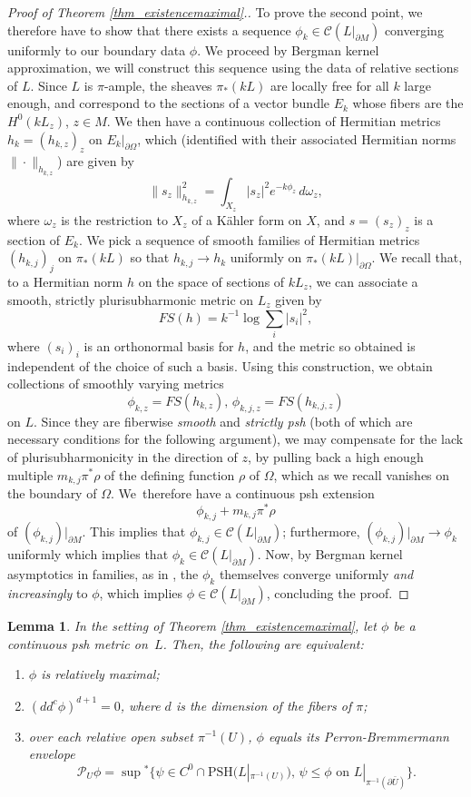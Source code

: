 \documentclass[JEP,XML,SOM,Unicode,NoEqCountersInSection,published]{cedram}
\newtheorem{lemma}[theorem]{Lemma}
\theoremstyle{definition}
\newcommand\cC{\mathcal{C}}
\newcommand\cP{\mathcal{P}}
\newcommand\mi{^{-1}}
\newcommand\norm{\|{\cdot}\|}
\newcommand\PSH{\mathrm{PSH}}
\begin{document}
\begin{proof}[Proof of Theorem \ref{thm_existencemaximal}.]
To prove the second point, we therefore have to show that there exists a sequence $\phi_k\in\cC(L|_{\partial M})$ converging uniformly to our boundary data $\phi$. We proceed by Bergman kernel approximation, \ie we will construct this sequence using the data of relative sections of $L$. Since $L$ is $\pi$-ample, the sheaves $\pi_*(kL)$ are locally free for all $k$ large enough, and correspond to the sections of a vector bundle $E_k$ whose fibers are the $H^0(kL_z)$, $z\in M$. We then have a continuous collection of Hermitian metrics $h_k=(h_{k,z})_z$ on $E_k|_{\partial \Omega}$, which (identified with their associated Hermitian norms $\norm_{h_{k,z}}$) are given by
\[
\|s_z\|_{h_{k,z}}^2=\int_{X_z}|s_z|^2 e^{-k\phi_z}\,d\omega_z,
\]
where $\omega_z$ is the restriction to $X_z$ of a Kähler form on $X$, and $s=(s_z)_z$ is a section of $E_k$. We pick a sequence of smooth families of Hermitian metrics $(h_{k,j})_j$ on $\pi_*(kL)$ so that $h_{k,j}\to h_k$ uniformly on $\pi_*(kL)|_{\partial \Omega}$. We recall that, to a Hermitian norm $h$ on the space of sections of $kL_z$, we can associate a smooth, strictly plurisubharmonic metric on $L_z$ given by
\[
FS(h)=k\mi\log\sum_i |s_i|^2,
\]
where $(s_i)_i$ is an orthonormal basis for $h$, and the metric so obtained is independent of the choice of such a basis. Using this construction, we obtain collections of smoothly varying metrics
\[
\phi_{k,z}=FS(h_{k,z}),\,\phi_{k,j,z}=FS(h_{k,j,z})
\]
on $L$. Since they are fiberwise \textit{smooth} and \textit{strictly psh} (both of which are necessary conditions for the following argument), we may compensate for the lack of plurisubharmonicity in the direction of $z$, by pulling back a high enough multiple $m_{k,j}\pi^*\rho$ of the defining function $\rho$ of $\Omega$, which as we recall vanishes on the boundary of $\Omega$. We~therefore have a continuous psh extension
\[
\phi_{k,j}+m_{k,j}\pi^*\rho
\]
of $(\phi_{k,j})|_{\partial M}$. This implies that $\phi_{k,j}\in \cC(L|_{\partial M})$; furthermore, $(\phi_{k,j})|_{\partial M}\to \phi_k$ uniformly which implies that $\phi_k\in\cC(L|_{\partial M})$. Now, by Bergman kernel asymptotics in families, as in \eg \cite[Th.\,4.1.1]{mamarinescu}, the $\phi_k$ themselves converge uniformly \textit{and increasingly} to $\phi$, which implies $\phi\in\cC(L|_{\partial M})$, concluding the proof.
\end{proof}
\begin{lemma}\label{lem_relmaxconditions}
In the setting of Theorem \ref{thm_existencemaximal}, let $\phi$ be a continuous psh metric on~$L$. Then, the following are equivalent:
\begin{enumerate}
\item $\phi$ is relatively maximal;
\item $(dd^c\phi)^{d+1}=0$, where $d$ is the dimension of the fibers of $\pi$;
\item over each relative open subset $\pi\mi(U)$, $\phi$ equals its Perron-Bremmermann envelope
\[
\cP_U \phi=\sup{}^*\{\psi\in C^0\cap \PSH(L|_{\pi\mi(U)}),\,\psi\leq\phi\text{ on }L|_{\pi\mi(\partial \bar U)}\}.
\]
\end{enumerate}
\end{lemma}
\end{document}

